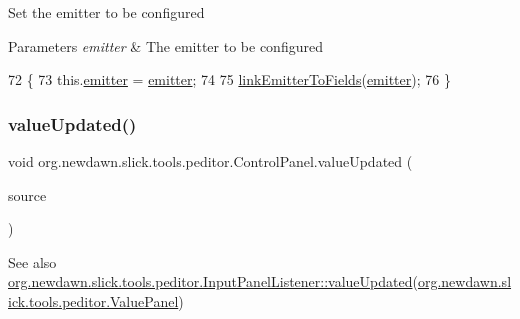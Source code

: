 Set the emitter to be configured


\begin{DoxyParams}{Parameters}
{\em emitter} & The emitter to be configured \\
\hline
\end{DoxyParams}

\begin{DoxyCode}
72                                                              \{
73         this.\mbox{\hyperlink{classorg_1_1newdawn_1_1slick_1_1tools_1_1peditor_1_1_control_panel_aaa170169fa574cb6b271f782afcd2517}{emitter}} = \mbox{\hyperlink{classorg_1_1newdawn_1_1slick_1_1tools_1_1peditor_1_1_control_panel_aaa170169fa574cb6b271f782afcd2517}{emitter}};
74         
75         \mbox{\hyperlink{classorg_1_1newdawn_1_1slick_1_1tools_1_1peditor_1_1_control_panel_a55fa468548caadc265ea28c5f3214a20}{linkEmitterToFields}}(\mbox{\hyperlink{classorg_1_1newdawn_1_1slick_1_1tools_1_1peditor_1_1_control_panel_aaa170169fa574cb6b271f782afcd2517}{emitter}});
76     \}
\end{DoxyCode}
\mbox{\label{classorg_1_1newdawn_1_1slick_1_1tools_1_1peditor_1_1_control_panel_ae266146cfb9e0f2868c04e510a6ddb43}} 
\subsubsection{\texorpdfstring{value\+Updated()}{valueUpdated()}}
{\footnotesize\ttfamily void org.\+newdawn.\+slick.\+tools.\+peditor.\+Control\+Panel.\+value\+Updated (\begin{DoxyParamCaption}\item[{\mbox{\hyperlink{classorg_1_1newdawn_1_1slick_1_1tools_1_1peditor_1_1_value_panel}{Value\+Panel}}}]{source }\end{DoxyParamCaption})\hspace{0.3cm}{\ttfamily [inline]}}

\begin{DoxySeeAlso}{See also}
\mbox{\hyperlink{interfaceorg_1_1newdawn_1_1slick_1_1tools_1_1peditor_1_1_input_panel_listener_acd0102f73058e7c2e899297962b0fa11}{org.\+newdawn.\+slick.\+tools.\+peditor.\+Input\+Panel\+Listener\+::value\+Updated}}(\mbox{\hyperlink{classorg_1_1newdawn_1_1slick_1_1tools_1_1peditor_1_1_value_panel}{org.\+newdawn.\+slick.\+tools.\+peditor.\+Value\+Panel}}) 
\end{DoxySeeAlso}


